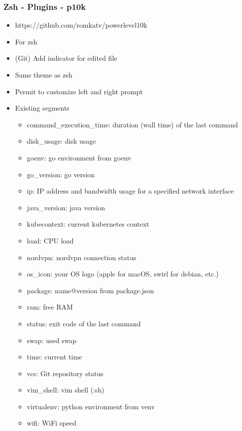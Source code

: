 \subsubsection{Zsh - Plugins - p10k}
\begin{frame}[fragile]{\subsubsecname}
  \begin{itemize}
    \item https://github.com/romkatv/powerlevel10k
    \item For zsh
    \item (Git) Add indicator for edited file
    \item Same theme as zsh
    \item Permit to customize left and right prompt
    \item Existing segments
    \begin{itemize}
      \item command\_execution\_time: duration (wall time) of the last command
      \item disk\_usage: disk usage
      \item goenv: go environment from goenv
      \item go\_version: go version
      \item ip: IP address and bandwidth usage for a specified network interface
      \item java\_version: java version
      \item kubecontext: current kubernetes context
      \item load: CPU load
      \item nordvpn: nordvpn connection status
      \item os\_icon: your OS logo (apple for macOS, swirl for debian, etc.)
      \item package: name@version from package.json
      \item ram: free RAM
      \item status: exit code of the last command
      \item swap: used swap
      \item time: current time
      \item vcs: Git repository status
      \item vim\_shell: vim shell (:sh)
      \item virtualenv: python environment from venv
      \item wifi: WiFi speed
    \end{itemize}
  \end{itemize}
\end{frame}
